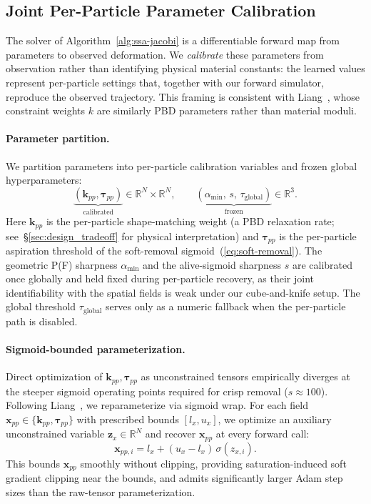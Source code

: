 \documentclass[letterpaper, 10 pt, conference]{ieeeconf}  %
\theoremstyle{tight}
\begin{document}
\subsection{Joint Per-Particle Parameter Calibration}
\label{sec:sysid-framework}

The solver of Algorithm~\ref{alg:ssa-jacobi} is a differentiable forward
map from parameters to observed deformation. We \emph{calibrate} these
parameters from observation rather than identifying physical material
constants: the learned values represent per-particle settings that,
together with our forward simulator, reproduce the observed trajectory.
This framing is consistent with Liang~\cite{liang2023}, whose constraint
weights $k$ are similarly PBD parameters rather than material moduli.

\paragraph{Parameter partition.}
We partition parameters into per-particle calibration variables and
frozen global hyperparameters:
\begin{equation}
  \underbrace{(\mathbf{k}_{pp},\boldsymbol{\tau}_{pp})}_{\text{calibrated}} \in \mathbb{R}^N \times \mathbb{R}^N,
  \qquad
  \underbrace{(\alpha_{\min},\,s,\,\tau_{\mathrm{global}})}_{\text{frozen}} \in \mathbb{R}^3.
  \label{eq:param-partition}
\end{equation}
Here $\mathbf{k}_{pp}$ is the per-particle shape-matching weight (a PBD
relaxation rate; see~\S\ref{sec:design_tradeoff} for physical interpretation)
and $\boldsymbol{\tau}_{pp}$ is the per-particle aspiration threshold of
the soft-removal sigmoid~(\ref{eq:soft-removal}). The geometric P(F)
sharpness $\alpha_{\min}$ and the alive-sigmoid sharpness $s$ are
calibrated once globally and held fixed during per-particle recovery, as
their joint identifiability with the spatial fields is weak under our
cube-and-knife setup. The global threshold $\tau_{\mathrm{global}}$
serves only as a numeric fallback when the per-particle path is disabled.

\paragraph{Sigmoid-bounded parameterization.}
Direct optimization of $\mathbf{k}_{pp}, \boldsymbol{\tau}_{pp}$ as
unconstrained tensors empirically diverges at the steeper sigmoid
operating points required for crisp removal ($s \approx 100$). Following
Liang~\cite{liang2023}, we reparameterize via sigmoid wrap. For each
field $\mathbf{x}_{pp} \in \{\mathbf{k}_{pp},\boldsymbol{\tau}_{pp}\}$
with prescribed bounds $[l_x, u_x]$, we optimize an auxiliary
unconstrained variable $\mathbf{z}_x \in \mathbb{R}^N$ and recover
$\mathbf{x}_{pp}$ at every forward call:
\begin{equation}
  \mathbf{x}_{pp,i} = l_x + (u_x - l_x)\,\sigma(z_{x,i}).
  \label{eq:sigmoid-bound}
\end{equation}
This bounds $\mathbf{x}_{pp}$ smoothly without clipping, providing
saturation-induced soft gradient clipping near the bounds, and admits
significantly larger Adam step sizes than the raw-tensor parameterization.
\end{document}
